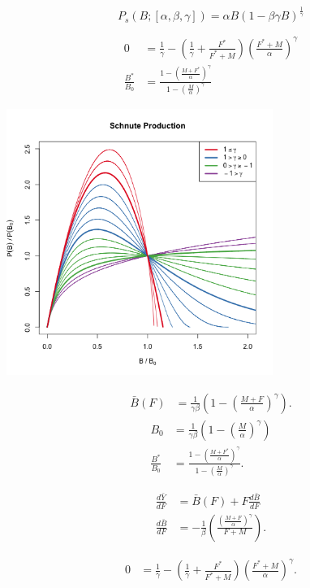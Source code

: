 \documentclass[ xcolor = pdftex, dvipsnames, table ]{beamer}
\begin{document}
%
\begin{frame}
\begin{equation*}
P_s(B;[\alpha, \beta, \gamma]) = \alpha B(1-\beta\gamma B)^{\frac{1}{\gamma}}
\end{equation*}
\begin{minipage}[h!]{0.49\textwidth}
\begin{align*}
0 &= \frac{1}{\gamma} - \left(\frac{1}{\gamma} + \frac{F^*}{F^*+M}\right)\left(\frac{F^*+M}{\alpha}\right)^\gamma\\
\frac{B^*}{B_0} &= \frac{1-\left(\frac{M+F^*}{\alpha}\right)^\gamma}{ 1-\left(\frac{M}{\alpha}\right)^\gamma }
\end{align*}
\end{minipage}
\begin{minipage}[h!]{0.49\textwidth}
\includegraphics[width=0.65\textwidth]{../../gpBias/g3.png}
\end{minipage}
\end{frame}

%
\begin{frame}
%
\begin{align}
\bar{B}(F) &= \frac{1}{\gamma \beta}\left(1-\left(\frac{M+F}{\alpha}\right)^\gamma\right).
\label{BsEq}
\end{align}
\begin{align}
B_0 &= \frac{1}{\gamma \beta}\left(1-\left(\frac{M}{\alpha}\right)^\gamma\right) \label{B0S}\\
\frac{B^*}{B_0} &= \frac{1-\left(\frac{M+F^*}{\alpha}\right)^\gamma}{ 1-\left(\frac{M}{\alpha}\right)^\gamma }. \label{BratS}
\end{align}

%
\begin{align}
\frac{d \bar{Y}}{dF} &= \bar B(F) + F \frac{d \bar B}{dF} \label{FderivS}\\
\frac{d \bar B}{dF} &= -\frac{1}{\beta}  \left(\frac{\left(\frac{M+F}{\alpha}\right)^\gamma}{F+M}\right)\label{dBdFS}.
\end{align}

\begin{align}\label{FmsyS}
0 &= \frac{1}{\gamma} - \left(\frac{1}{\gamma} + \frac{F^*}{F^*+M}\right)\left(\frac{F^*+M}{\alpha}\right)^\gamma.
\end{align}
\end{frame}
\end{document}
